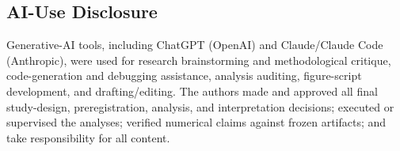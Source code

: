 \subsection{AI-Use Disclosure}
Generative-AI tools, including ChatGPT (OpenAI) and Claude/Claude Code (Anthropic),
were used for research brainstorming and methodological critique, code-generation and
debugging assistance, analysis auditing, figure-script development, and
drafting/editing. The authors made and approved all final study-design, preregistration,
analysis, and interpretation decisions; executed or supervised the analyses; verified
numerical claims against frozen artifacts; and take responsibility for all content.

